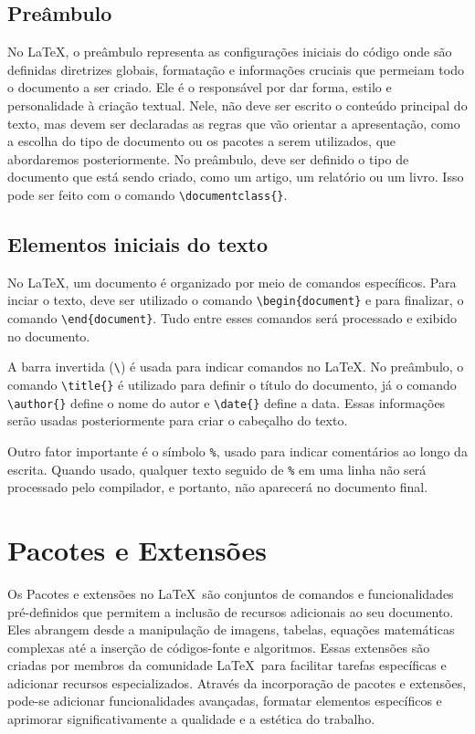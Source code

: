 \subsection{Pre\^ambulo}
\label{sec:5}
No \LaTeX, o pre\^ambulo representa as configura\c c\~oes iniciais do c\'odigo onde s\~ao definidas diretrizes globais, formata\c c\~ao e informa\c c\~oes cruciais que permeiam todo o documento a ser criado. Ele \'e o respons\'avel por dar forma, estilo e personalidade \`a cria\c c\~ao textual. Nele, não deve ser escrito o conte\'udo principal do texto, mas devem ser declaradas as regras que v\~ao orientar a apresenta\c c\~ao, como a escolha do tipo de documento ou os pacotes a serem utilizados, que abordaremos posteriormente. No pre\^ambulo, deve ser definido o tipo de documento que está sendo criado, como um artigo, um relatório ou um livro.  Isso pode ser feito com o comando \texttt{\textbackslash documentclass\{\}}.

\subsection{Elementos iniciais do texto}
No \LaTeX, um documento \'e organizado por meio de comandos espec\'ificos. Para inciar o texto, deve ser utilizado o comando \texttt{\textbackslash begin\{document\}} e para finalizar, o comando \texttt{\textbackslash end\{document\}}. Tudo entre esses comandos será processado e exibido no documento.

\noindent A barra invertida (\texttt{\textbackslash}) \'e usada para indicar comandos no \LaTeX. No preâmbulo, o comando \texttt{\textbackslash title\{\}} \'e utilizado para definir o t\'itulo do documento, j\'a o comando \texttt{\textbackslash author\{\}} define o nome do autor e \texttt{\textbackslash date\{\}} define a data. Essas informações serão usadas posteriormente para criar o cabe\c calho do texto.

\noindent Outro fator importante \'e o s\'imbolo \verb|%|, usado para indicar coment\'arios ao longo da escrita. Quando usado, qualquer texto seguido de \verb|%| em uma linha n\~ao ser\'a processado pelo compilador, e portanto, n\~ao aparecer\'a no documento final.


\section{Pacotes e Extens\~oes}
\label{sec:6}
 Os Pacotes e extensões no \LaTeX\ são conjuntos de comandos e funcionalidades pr\'e-definidos que permitem a inclus\~ao de recursos adicionais ao seu documento. Eles abrangem desde a manipula\c c\~ao de imagens, tabelas, equa\c c\~oes matem\'aticas complexas at\'e a inser\c c\~ao de c\'odigos-fonte e algoritmos. Essas extens\~oes s\~ao criadas por membros da comunidade \LaTeX\ para facilitar tarefas espec\'ificas e adicionar recursos especializados. Atrav\'es da incorpora\c c\~ao de pacotes e extens\~oes, pode-se adicionar funcionalidades avan\c cadas, formatar elementos espec\'ificos e aprimorar significativamente a qualidade e a est\'etica do trabalho. 

